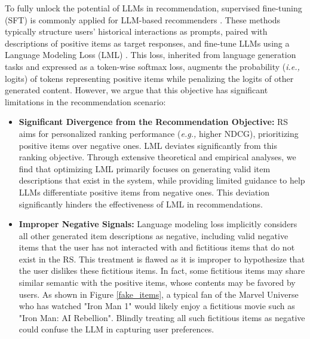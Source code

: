 \documentclass[sigconf,natbib=true]{acmart}
\newcommand{\ie}{\emph{i.e., }}
\newcommand{\eg}{\emph{e.g., }}
\begin{document}
To fully unlock the potential of LLMs in recommendation, supervised fine-tuning (SFT) is commonly applied for LLM-based recommenders \cite{bao2023tallrec, bao2023bi, liao2024llara, kim2024large, gao2024end, zheng2024adapting}. These methods typically structure users' historical interactions as prompts, paired with descriptions of positive items as target responses, and fine-tune LLMs using a Language Modeling Loss (LML) \cite{radford2018improving}. This loss, inherited from language generation tasks and expressed as a token-wise softmax loss, augments the probability (\ie logits) of tokens representing positive items while penalizing the logits of other generated content. However, we argue that this objective has significant limitations in the recommendation scenario:
\begin{itemize}[left=5pt]
    \item \textbf{Significant Divergence from the Recommendation Objective:} RS aims for personalized ranking performance (\eg higher NDCG), prioritizing positive items over negative ones. LML deviates significantly from this ranking objective. Through extensive theoretical and empirical analyses, we find that optimizing LML primarily focuses on generating valid item descriptions that exist in the system, while providing limited guidance to help LLMs differentiate positive items from negative ones. This deviation significantly hinders the effectiveness of LML in recommendations.
    \item  \textbf{Improper Negative Signals:} Language modeling loss implicitly considers all other generated item descriptions as negative, including valid negative items that the user has not interacted with and fictitious items that do not exist in the RS. This treatment is flawed as it is improper to hypothesize that the user dislikes these fictitious items. In fact, some fictitious items may share similar semantic with the positive items, whose contents may be favored by users. 
    As shown in Figure \ref{fake_items}, a typical fan of the Marvel Universe who has watched "Iron Man 1" would likely enjoy a fictitious movie such as "Iron Man: AI Rebellion". Blindly treating all such fictitious items as negative could confuse the LLM in capturing user preferences.
\end{itemize}
\end{document}
